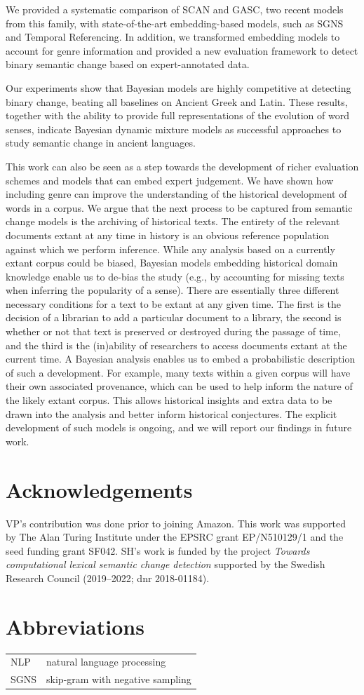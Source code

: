 \documentclass[output=paper]{langscibook}
\begin{document}
We provided a systematic comparison of SCAN and GASC, two recent models from this family, with state-of-the-art embedding-based models, such as SGNS and Temporal Referencing. In addition, we transformed embedding models to account for genre information and provided a new evaluation framework to detect binary semantic change based on expert-annotated data. 

Our experiments show that Bayesian models are highly competitive at detecting binary change, beating all baselines on Ancient Greek and Latin. These results, together with the ability to provide full representations of the evolution of word senses, indicate Bayesian dynamic mixture models as successful approaches to study semantic change in ancient languages.



This work can also be seen as a step towards the development of richer evaluation schemes and models that can embed expert judgement. We have shown how including genre can improve the understanding of the historical development of words in a corpus. 
We argue that the next process to be captured from semantic change models is the archiving of historical texts. The entirety of the relevant documents extant at any time in history is an obvious reference population against which we perform inference. While any analysis based on a currently extant corpus could be biased, Bayesian models embedding historical domain knowledge enable us to de-bias the study (e.g., by accounting for missing texts when inferring the popularity of a sense).
There are essentially three different necessary conditions for a text to be extant at any given time. The first is the decision of a librarian to add a particular document to a library, the second is whether or not that text is preserved or destroyed during the passage of time, and the third is the (in)ability of researchers to access documents extant at the current time. A Bayesian analysis enables us to embed a probabilistic description of such a development. For example, many texts within a given corpus will have their own associated provenance, which can be used to help inform the nature of the likely extant corpus. This allows historical insights and extra data to be drawn into the analysis and better inform historical conjectures.  The explicit development of such models is ongoing, and we will report our findings in future work.


\section*{Acknowledgements}
VP's contribution was done prior to joining Amazon.
This work was supported by The Alan Turing Institute under the EPSRC grant EP/N510129/1 and the seed funding grant SF042. 
SH's work is funded by the project \textit{Towards computational lexical semantic change detection} supported  by the Swedish Research Council (2019--2022; dnr 2018-01184).

\section*{Abbreviations}
\begin{tabularx}{\textwidth}{@{}lQ@{}}
NLP & natural language processing \\
SGNS & skip-gram with negative sampling
\end{tabularx}

{\sloppy\printbibliography[heading=subbibliography,notkeyword=this]}
\end{document}
